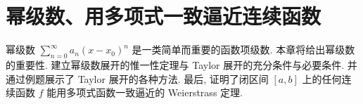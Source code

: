
\chapter{幂级数、用多项式一致逼近连续函数}\label{ch:14}

幂级数 $\sum_{n=0}^{\infty}a_{n}(x-x_{0})^{n}$ 是一类简单而重要的函数项级数. 本章将给出幂级数的重要性. 建立幂级数展开的惟一性定理与 Taylor 展开的充分条件与必要条件. 并通过例题展示了 Taylor 展开的各种方法. 最后, 证明了闭区间 $[a,b]$ 上的任何连续函数 $f$ 能用多项式函数一致逼近的 Weierstrass 定理.





